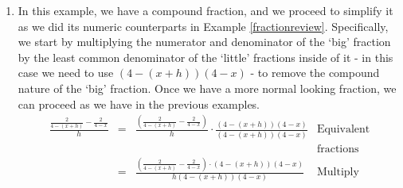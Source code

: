 \documentclass{ximera}
\begin{document}
\begin{example}
\begin{explanation}
\begin{enumerate}
\[\begin{array}{rclr}
 \frac{3y(y+4)}{(y-4)^2y(y+4)}  - \frac{(y+1)(y-4)}{y(y-4)^2(y+4)} & = &  \frac{3y(y+4) -(y+1)(y-4)}{(y-4)^2y(y+4)}  & \text{Subtract numerators} \\  

& = & \frac{3y^2 + 12y - (y^2 - 3y - 4)}{(y-4)^2 y (y+4)} & \text{Distribute} \\  

& = & \frac{3y^2 + 12y - y^2 + 3y + 4}{(y-4)^2 y (y+4)} & \text{Distribute} \\  

& = & \frac{2y^2 + 15y + 4}{y (y+4) (y-4)^2} & \text{Gather like terms} \\ \end{array}\] We would like to factor the numerator and cancel factors it has in common with the denominator.  After a few attempts, it appears as if the numerator doesn't factor, at least over the integers.  As a check, we compute the discriminant of $2y^2 + 15y + 4$ and get $15^2 - 4(2)(4) = 193$.  This isn't a perfect square so we know that the quadratic equation $2y^2 + 15y + 4=0$ has irrational solutions. This means $2y^2 + 15y + 4$  can't factor over the integers\footnote{See the remarks following Theorem \ref{discriminanttheoremrealversion}.} so we are done.  

\item  In this example, we have a compound fraction, and we proceed to simplify it as we did its numeric counterparts in Example \ref{fractionreview}.  Specifically, we start by multiplying the numerator and denominator of the `big' fraction by the least common denominator of the `little' fractions inside of it - in this case we need to use $(4-(x+h))(4-x)$ - to remove the compound nature of the `big' fraction.  Once we have a more normal looking fraction, we can proceed as we have in the previous examples.\[ \begin{array}{rclr}

\frac{\frac{2}{4 - (x+h)} - \frac{2}{4-x}}{h} & = & \frac{\left(\frac{2}{4 - (x+h)} - \frac{2}{4-x}\right)}{h}  \cdot \frac{(4-(x+h))(4-x)}{(4-(x+h))(4-x)} & \text{Equivalent} \\  
                                                 &    &                                                                                                            & \text{fractions} \\

& = & \frac{\left(\frac{2}{4 - (x+h)} - \frac{2}{4-x}\right) \cdot (4-(x+h))(4-x) }{h (4-(x+h))(4-x)} & \text{Multiply} \\  


\end{array}\]
\end{enumerate}
\end{explanation}
\end{example}
\end{document}
